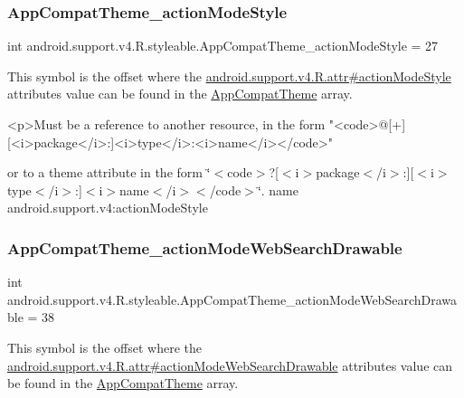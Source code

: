 \subsubsection{\texorpdfstring{App\+Compat\+Theme\+\_\+action\+Mode\+Style}{AppCompatTheme\_actionModeStyle}}
{\footnotesize\ttfamily int android.\+support.\+v4.\+R.\+styleable.\+App\+Compat\+Theme\+\_\+action\+Mode\+Style = 27\hspace{0.3cm}{\ttfamily [static]}}

This symbol is the offset where the \hyperlink{classandroid_1_1support_1_1v4_1_1R_1_1attr_a718477cf455efe9593ccf7d102a1eeb6}{android.\+support.\+v4.\+R.\+attr\#action\+Mode\+Style} attribute\textquotesingle{}s value can be found in the \hyperlink{classandroid_1_1support_1_1v4_1_1R_1_1styleable_ac07ebbe62ed977f6dcaadc6397840ace}{App\+Compat\+Theme} array.

\begin{DoxyVerb}      <p>Must be a reference to another resource, in the form "<code>@[+][<i>package</i>:]<i>type</i>:<i>name</i></code>"
\end{DoxyVerb}
 or to a theme attribute in the form \char`\"{}$<$code$>$?\mbox{[}$<$i$>$package$<$/i$>$\+:\mbox{]}\mbox{[}$<$i$>$type$<$/i$>$\+:\mbox{]}$<$i$>$name$<$/i$>$$<$/code$>$\char`\"{}.  name android.\+support.\+v4\+:action\+Mode\+Style \mbox{\label{classandroid_1_1support_1_1v4_1_1R_1_1styleable_a0f006cb9d33142dc621ea6ea9cd07941}} 
\subsubsection{\texorpdfstring{App\+Compat\+Theme\+\_\+action\+Mode\+Web\+Search\+Drawable}{AppCompatTheme\_actionModeWebSearchDrawable}}
{\footnotesize\ttfamily int android.\+support.\+v4.\+R.\+styleable.\+App\+Compat\+Theme\+\_\+action\+Mode\+Web\+Search\+Drawable = 38\hspace{0.3cm}{\ttfamily [static]}}

This symbol is the offset where the \hyperlink{classandroid_1_1support_1_1v4_1_1R_1_1attr_ab88c21eea7bf54bfd711c9326ca83fc3}{android.\+support.\+v4.\+R.\+attr\#action\+Mode\+Web\+Search\+Drawable} attribute\textquotesingle{}s value can be found in the \hyperlink{classandroid_1_1support_1_1v4_1_1R_1_1styleable_ac07ebbe62ed977f6dcaadc6397840ace}{App\+Compat\+Theme} array.

